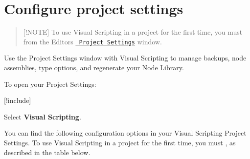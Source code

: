 \chapter{Configure project settings}
\hypertarget{md__library_2_package_cache_2com_8unity_8visualscripting_0d1_89_82_2_documentation_0i_2vs-configuration}{}\label{md__library_2_package_cache_2com_8unity_8visualscripting_0d1_89_82_2_documentation_0i_2vs-configuration}
\label{md__library_2_package_cache_2com_8unity_8visualscripting_0d1_89_82_2_documentation_0i_2vs-configuration_autotoc_md1703}%
%
 \begin{quote}
\mbox{[}!\+NOTE\mbox{]} To use Visual Scripting in a project for the first time, you must  from the Editor\textquotesingle{}s \href{https://docs.unity3d.com/Manual/comp-ManagerGroup.html}{\texttt{ Project Settings}} window. \end{quote}
Use the Project Settings window with Visual Scripting to manage backups, node assemblies, type options, and regenerate your Node Library.

To open your Project Settings\+:


\begin{DoxyEnumerate}
\item \mbox{[}!include\mbox{]}
\end{DoxyEnumerate}
\begin{DoxyEnumerate}
\item Select {\bfseries{Visual Scripting}}. ~\newline

\end{DoxyEnumerate}

You can find the following configuration options in your Visual Scripting Project Settings. To use Visual Scripting in a project for the first time, you must , as described in the table below.

